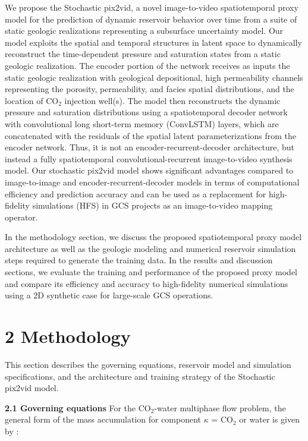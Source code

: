 \documentclass[10pt, twoside]{article}
\begin{document}
We propose the Stochastic pix2vid, a novel image-to-video spatiotemporal proxy model for the prediction of dynamic reservoir behavior over time from a suite of static geologic realizations representing a subsurface uncertainty model. Our model exploits the spatial and temporal structures in latent space to dynamically reconstruct the time-dependent pressure and saturation states from a static geologic realization. The encoder portion of the network receives as inputs the static geologic realization with geological depositional, high permeability channels representing the porosity, permeability, and facies spatial distributions, and the location of CO$_2$ injection well(s). The model then reconstructs the dynamic pressure and saturation distributions using a spatiotemporal decoder network with convolutional long short-term memory (ConvLSTM) layers, which are concatenated with the residuals of the spatial latent parameterizations from the encoder network. Thus, it is not an encoder-recurrent-decoder architecture, but instead a fully spatiotemporal convolutional-recurrent image-to-video synthesis model. Our stochastic pix2vid model shows significant advantages compared to image-to-image and encoder-recurrent-decoder models in terms of computational efficiency and prediction accuracy and can be used as a replacement for high-fidelity simulations (HFS) in GCS projects as an image-to-video mapping operator. 

In the methodology section, we discuss the proposed spatiotemporal proxy model architecture as well as the geologic modeling and numerical reservoir simulation steps required to generate the training data. In the results and discussion sections, we evaluate the training and performance of the proposed proxy model and compare its efficiency and accuracy to high-fidelity numerical simulations using a 2D synthetic case for large-scale GCS operations. 

\section*{\textbf{2 Methodology}}
This section describes the governing equations, reservoir model and simulation specifications, and the architecture and training strategy of the Stochastic pix2vid model.

\textbf{2.1 Governing equations} 
For the CO$_2$-water multiphase flow problem, the general form of the mass accumulation for component $\kappa$ = CO$_2$ or water is given by \cite{pruess1999tough2}:
\end{document}
